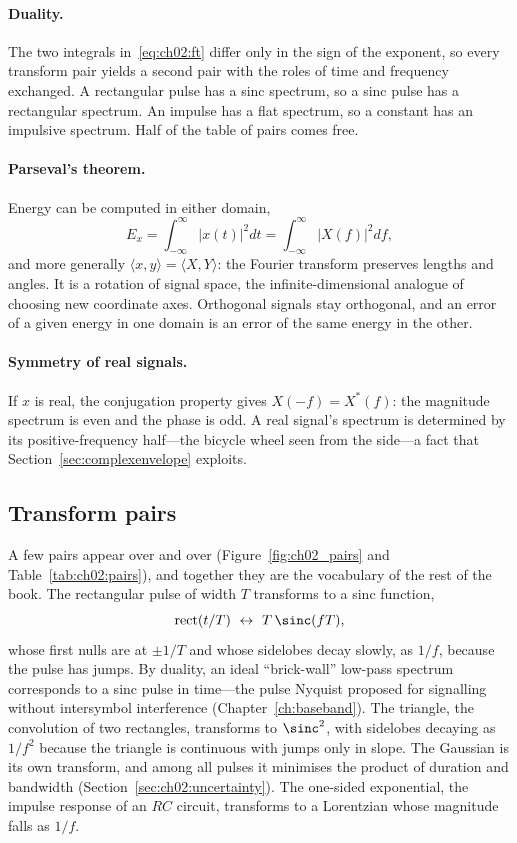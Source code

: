 \paragraph{Duality.} The two integrals in~\eqref{eq:ch02:ft} differ only in the sign of the
exponent, so every transform pair yields a second pair with the roles of time and frequency
exchanged. A rectangular pulse has a sinc spectrum, so a sinc pulse has a rectangular spectrum. An
impulse has a flat spectrum, so a constant has an impulsive spectrum. Half of the table of pairs
comes free.

\paragraph{Parseval's theorem.} Energy can be computed in either domain,
\begin{equation}
E_x=\int_{-\infty}^{\infty}|x(t)|^2dt=\int_{-\infty}^{\infty}|X(f)|^2df ,
\label{eq:ch02:parseval}
\end{equation}
and more generally $\langle x,y\rangle=\langle X,Y\rangle$: the Fourier transform preserves lengths
and angles. It is a rotation of signal space, the infinite-dimensional analogue of choosing new
coordinate axes. Orthogonal signals stay orthogonal, and an error of a given energy in one domain
is an error of the same energy in the other.

\paragraph{Symmetry of real signals.} If $x$ is real, the conjugation property gives
$X(-f)=X^*(f)$: the magnitude spectrum is even and the phase is odd. A real signal's spectrum is
determined by its positive-frequency half---the bicycle wheel seen from the side---a fact that
Section~\ref{sec:complexenvelope} exploits.

\subsection{Transform pairs}

A few pairs appear over and over (Figure~\ref{fig:ch02_pairs} and Table~\ref{tab:ch02:pairs}), and
together they are the vocabulary of the rest of the book. The rectangular pulse of width $T$
transforms to a sinc function,
\begin{equation}
\operatorname{rect}(t/T)\ \leftrightarrow\ T\,\sinc(fT),
\label{eq:ch02:rectsinc}
\end{equation}
whose first nulls are at $\pm1/T$ and whose sidelobes decay slowly, as $1/f$, because the pulse has
jumps. By duality, an ideal ``brick-wall'' low-pass spectrum corresponds to a sinc pulse in
time---the pulse Nyquist proposed for signalling without intersymbol interference
(Chapter~\ref{ch:baseband}). The triangle, the convolution of two rectangles, transforms to
$\sinc^2$, with sidelobes decaying as $1/f^2$ because the triangle is continuous with jumps only in
slope. The Gaussian is its own transform, and among all pulses it minimises the product of
duration and bandwidth (Section~\ref{sec:ch02:uncertainty}). The one-sided exponential, the impulse
response of an $RC$ circuit, transforms to a Lorentzian whose magnitude falls as $1/f$.

